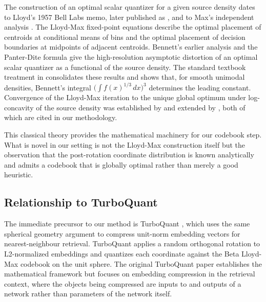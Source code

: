 The construction of an optimal scalar quantizer for a given source
density dates to Lloyd's 1957 Bell Labs memo, later published as
\citet{lloyd1982}, and to Max's independent analysis
\citep{max1960}. The Lloyd-Max fixed-point equations describe the
optimal placement of centroids at conditional means of bins and the
optimal placement of decision boundaries at midpoints of adjacent
centroids. Bennett's earlier analysis \citep{bennett1948} and the
Panter-Dite formula \citep{panter1951} give the high-resolution
asymptotic distortion of an optimal scalar quantizer as a functional of
the source density. The standard textbook treatment in \citet{gershogray1992}
consolidates these results and shows that, for smooth unimodal
densities, Bennett's integral $\big(\int f(x)^{1/3}\, dx\big)^3$
determines the leading constant. Convergence of the Lloyd-Max iteration
to the unique global optimum under log-concavity of the source density
was established by \citet{fleischer1964} and extended by
\citet{kieffer1983}, both of which are cited in our methodology.

This classical theory provides the mathematical machinery for our
codebook step. What is novel in our setting is not the Lloyd-Max
construction itself but the observation that the post-rotation
coordinate distribution is known analytically and admits a codebook
that is globally optimal rather than merely a good heuristic.

\subsection{Relationship to TurboQuant}

The immediate precursor to our method is TurboQuant \citep{turboquant},
which uses the same spherical geometry argument to compress unit-norm
embedding vectors for nearest-neighbour retrieval. TurboQuant applies
a random orthogonal rotation to L2-normalized embeddings and quantizes
each coordinate against the Beta Lloyd-Max codebook on the unit sphere.
The original TurboQuant paper establishes the mathematical framework
but focuses on embedding compression in the retrieval context, where the
objects being compressed are inputs to and outputs of a network rather
than parameters of the network itself.

